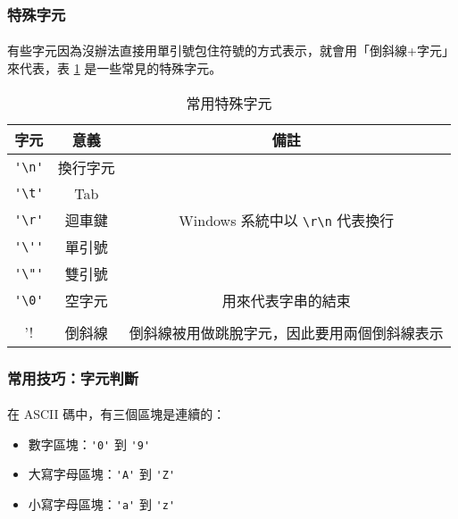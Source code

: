 \documentclass[12pt,a4paper,oneside]{report}
\begin{document}
\begin{CJK}{UTF8}{bkai}
\subsubsection{特殊字元}

\paragraph{}有些字元因為沒辦法直接用單引號包住符號的方式表示，就會用「倒斜線+字元」來代表，表 \ref{string:mani:table:char:special} 是一些常見的特殊字元。

\begin{table}[h!]
  \centering
  \begin{tabular}{|c|c|c|}
  \hline
  \textbf{字元} & \textbf{意義} & \textbf{備註}\\
  \hline\hline
  \lstinline!'\n'! & 換行字元 &\\
  \hline
  \lstinline!'\t'! & Tab &\\
  \hline
  \lstinline!'\r'! & 迴車鍵 & Windows 系統中以 \lstinline!\r\n! 代表換行\\
  \hline
  \lstinline!'\''! & 單引號 &\\
  \hline
  \lstinline!'\"'! & 雙引號 &\\
  \hline
  \lstinline!'\0'! & 空字元 & 用來代表字串的結束\\
  \hline
  \lstinline!'\\'! & 倒斜線 & 倒斜線被用做跳脫字元，因此要用兩個倒斜線表示\\
  \hline
  \end{tabular}
  \caption{常用特殊字元}
  \label{string:mani:table:char:special}
\end{table}

\subsubsection{常用技巧：字元判斷}

\paragraph{}在 ASCII 碼中，有三個區塊是連續的：

\begin{itemize}
\item 數字區塊：\lstinline!'0'! 到 \lstinline!'9'!
\item 大寫字母區塊：\lstinline!'A'! 到 \lstinline!'Z'!
\item 小寫字母區塊：\lstinline!'a'! 到 \lstinline!'z'!
\end{itemize}


\end{CJK}
\end{document}
